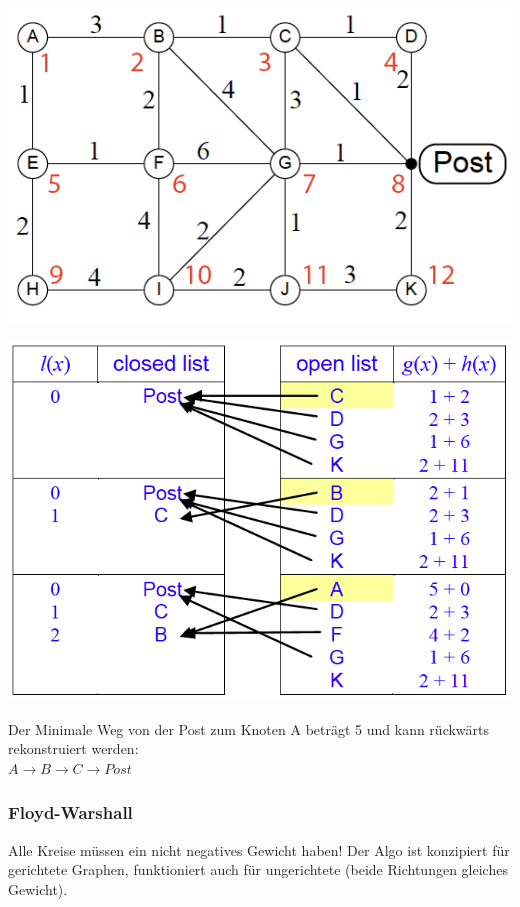 \begin{minipage}{0.5\textwidth}
	\includegraphics[width=\textwidth]{Content/Graphen/PostAStar.png}
\end{minipage}
\begin{minipage}{0.5\textwidth}
	\includegraphics[width=\textwidth]{Content/Graphen/AStar.png}
\end{minipage}

Der Minimale Weg von der Post zum Knoten A beträgt 5 und kann rückwärts rekonstruiert werden:\\ $A\rightarrow B\rightarrow C \rightarrow Post$\\

\subsubsection{Floyd-Warshall}
Alle Kreise müssen ein nicht negatives Gewicht haben! Der Algo ist konzipiert für gerichtete Graphen, funktioniert auch für ungerichtete (beide Richtungen gleiches Gewicht).

